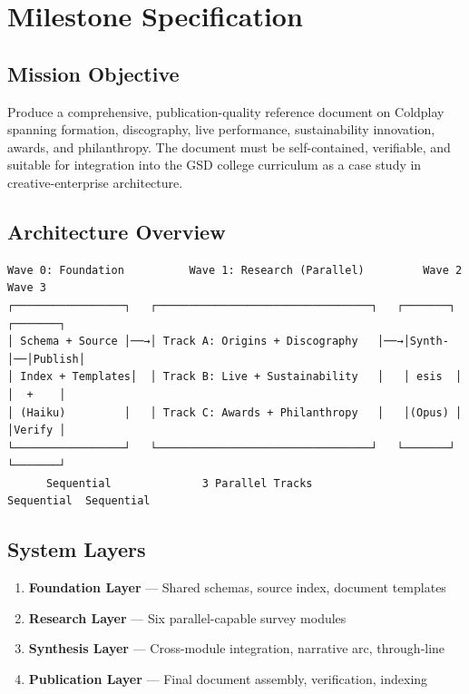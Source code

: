 \documentclass[11pt,letterpaper]{article}
\newcommand{\stageheader}[2]{%
  \noindent\colorbox{#2}{\makebox[\textwidth][l]{%
    \textcolor{white}{\bfseries\sffamily\hspace{6pt}#1\hspace{6pt}}}}%
  \vspace{0.5em}\par%
}
\begin{document}
\newpage

\stageheader{STAGE 3 --- MISSION PACKAGE}{tertiary}

\section{Milestone Specification}

\subsection{Mission Objective}

Produce a comprehensive, publication-quality reference document on Coldplay spanning formation, discography, live performance, sustainability innovation, awards, and philanthropy. The document must be self-contained, verifiable, and suitable for integration into the GSD college curriculum as a case study in creative-enterprise architecture.

\subsection{Architecture Overview}

\begin{asciibox}
\begin{verbatim}
Wave 0: Foundation          Wave 1: Research (Parallel)         Wave 2    Wave 3
┌─────────────────┐   ┌─────────────────────────────────┐   ┌───────┐  ┌───────┐
│ Schema + Source │──→│ Track A: Origins + Discography   │──→│Synth- │──│Publish│
│ Index + Templates│  │ Track B: Live + Sustainability   │   │ esis  │  │  +    │
│ (Haiku)         │   │ Track C: Awards + Philanthropy   │   │(Opus) │  │Verify │
└─────────────────┘   └─────────────────────────────────┘   └───────┘  └───────┘
      Sequential              3 Parallel Tracks              Sequential  Sequential
\end{verbatim}
\end{asciibox}

\subsection{System Layers}

\begin{enumerate}[leftmargin=2em]
  \item \textbf{Foundation Layer} --- Shared schemas, source index, document templates
  \item \textbf{Research Layer} --- Six parallel-capable survey modules
  \item \textbf{Synthesis Layer} --- Cross-module integration, narrative arc, through-line
  \item \textbf{Publication Layer} --- Final document assembly, verification, indexing
\end{enumerate}
\end{document}
